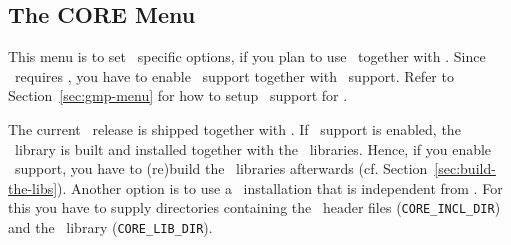 
\subsection{The CORE Menu}\label{sec:core-menu}

This menu is to set \core\ specific options, if you plan to use \core\ 
together with \cgal. Since \core\ requires \gmp, you have to enable
\gmp\ support together with \core\ support. Refer to
Section~\ref{sec:gmp-menu} for how to setup \gmp\ support for \cgal.

The current \core\ release is shipped together with \cgal. If \core\ 
support is enabled, the \core\ library is built and installed together
with the \cgal\ libraries. Hence, if you enable \core\ support, you
have to (re)build the \cgal\ libraries afterwards (cf.
Section~\ref{sec:build-the-libs}). Another option is to use a \core\ 
installation that is independent from \cgal. For this you have to
supply directories containing the \core\ header files
(\texttt{CORE\_INCL\_DIR})\TTindex{CORE\_INCL\_DIR} and the \core\ 
library ({\tt CORE\_LIB\_DIR}). \bigskip

